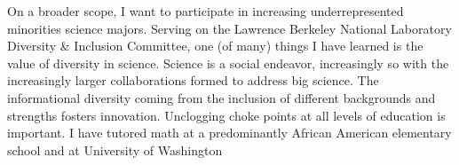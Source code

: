 \documentclass{article}
\newcommand{\where}{University of Washington }
\newcommand{\where}{University of Michigan }
\begin{document}
On a broader scope, I want to participate in increasing underrepresented minorities science majors.
Serving on the Lawrence Berkeley National Laboratory Diversity \& Inclusion Committee, one (of many) things I have
learned is the value of diversity in science.  Science is a social endeavor, increasingly so with
the increasingly larger collaborations formed to address big science.  The informational diversity
coming  from the inclusion of different  backgrounds and strengths fosters innovation.
Unclogging choke points at all levels of education is important.  I have tutored math at a predominantly African American
elementary school and at  \where \iftoggle{UW}{I plan to work on increasing undergraduate enrollment through the
Office of Minority Affairs \& Diversity Recruitment and Outreach.}{by being a 
mentor in the Michigan Louis Stokes Alliance for Minority Participation.}
\end{document}
